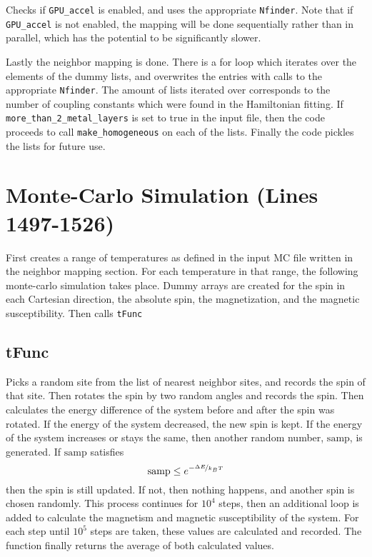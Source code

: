 \documentclass[12pt]{article}
\newcommand{\pmint}[1]{\texttt{#1}}
\begin{document}
Checks if \pmint{GPU_accel} is enabled, and uses the appropriate \pmint{Nfinder}. Note that if \pmint{GPU_accel} is not enabled, the mapping will be done sequentially rather than in parallel, which has the potential to be significantly slower. 

Lastly the neighbor mapping is done. There is a for loop which iterates over the elements of the dummy lists, and overwrites the entries with calls to the appropriate \pmint{Nfinder}. The amount of lists iterated over corresponds to the number of coupling constants which were found in the Hamiltonian fitting. If \pmint{more_than_2_metal_layers} is set to true in the input file, then the code proceeds to call \pmint{make_homogeneous} on each of the lists. Finally the code pickles the lists for future use. 


\section*{Monte-Carlo Simulation (Lines 1497-1526)} %
First creates a range of temperatures as defined in the input MC file written in the neighbor mapping section. For each temperature in that range, the following monte-carlo simulation takes place. Dummy arrays are created for the spin in each Cartesian direction, the absolute spin, the magnetization, and the magnetic susceptibility. Then calls \pmint{tFunc}
\subsection*{tFunc}
Picks a random site from the list of nearest neighbor sites, and records the spin of that site. Then rotates the spin by two random angles and records the spin. Then calculates the energy difference of the system before and after the spin was rotated. If the energy of the system decreased, the new spin is kept. If the energy of the system increases or stays the same, then another random number, $\mathrm{samp}$, is generated. If $\mathrm{samp}$ satisfies
\begin{equation*}
    \mathrm{samp} \leq e^{-\nicefrac{\Delta E}{k_B T}}
\end{equation*}
then the spin is still updated. If not, then nothing happens, and another spin is chosen randomly. This process continues for $10^4$ steps, then an additional loop is added to calculate the magnetism and magnetic susceptibility of the system. For each step until $10^5$ steps are taken, these values are calculated and recorded. The function finally returns the average of both calculated values. 
\end{document}
